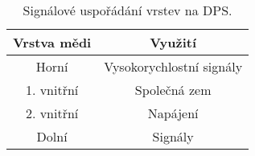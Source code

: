 \begin{table}[h!]
\centering

\begin{tabular}{|c|c|}
\hline 
Vrstva mědi & Využití \\ 
\hline 
\hline 
Horní & Vysokorychlostní signály \\ 
\hline 
1. vnitřní & Společná zem \\ 
\hline 
2. vnitřní & Napájení \\ 
\hline 
Dolní & Signály \\ 
\hline 
\end{tabular} 

\caption{Signálové uspořádání vrstev na DPS.} 
\label{table:signalStackup}
\end{table} 